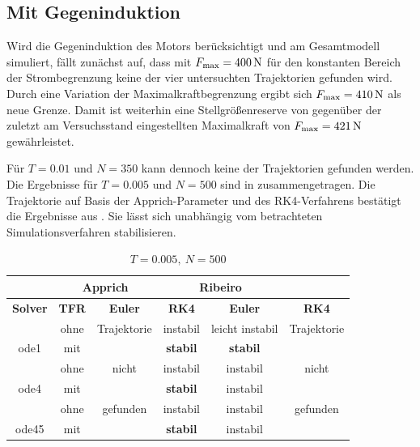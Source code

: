 \subsection{Mit Gegeninduktion}

Wird die Gegeninduktion des Motors berücksichtigt und am Gesamtmodell simuliert, fällt zunächst auf, dass mit $F_{\mathrm{max}}= 400\,\mathrm{N}$ für den konstanten Bereich der Strombegrenzung keine der vier untersuchten Trajektorien gefunden wird. Durch eine Variation der Maximalkraftbegrenzung ergibt sich $F_{\mathrm{max}}= 410\,\mathrm{N}$ als neue Grenze. Damit ist weiterhin eine Stellgrößenreserve von  gegenüber der zuletzt am Versuchsstand eingestellten Maximalkraft von $F_{\mathrm{max}}= 421\,\mathrm{N}$ gewährleistet. 

Für $T=0.01$ und $N=350$ kann dennoch keine der Trajektorien gefunden werden. Die Ergebnisse für $T=0.005$ und $N=500$ sind in  zusammengetragen. Die Trajektorie auf Basis der Apprich-Parameter und des RK4-Verfahrens bestätigt die Ergebnisse aus . Sie lässt sich unabhängig vom betrachteten Simulationsverfahren stabilisieren.
\begin{table}[H]
	\centering
	\caption{$T=0.005, \ N=500$}
		\begin{tabular}{c|c|c|c|c|c}
			\rowcolor[gray]{0.9}
			\multicolumn{2}{c|}{\textbf{Simulation}} & \multicolumn{2}{c|}{\textbf{Apprich}} & \multicolumn{2}{c}{\textbf{Ribeiro}} \\
			\midrule
			\rowcolor[gray]{0.9}
			\textbf{Solver} & \textbf{TFR} & \textbf{Euler} & \textbf{RK4} & \textbf{Euler} & \textbf{RK4} \\
			\midrule
			\cellcolor[gray]{0.9}  											& \cellcolor[gray]{.9}ohne & Trajektorie  & instabil & leicht instabil & Trajektorie\\
			\multirow{-2}{*}{\cellcolor[gray]{.9}ode1}	& \cellcolor[gray]{.9}mit  &   						& \textbf{stabil} & \textbf{stabil} 				 & 	\\
			\midrule		
			\cellcolor[gray]{0.9}  											& \cellcolor[gray]{.9}ohne & nicht	& instabil 						& instabil & nicht\\
			\multirow{-2}{*}{\cellcolor[gray]{.9}ode4}	& \cellcolor[gray]{.9}mit  &        & \textbf{stabil}   	& instabil & \\
			\midrule	
			\cellcolor[gray]{0.9}  											& \cellcolor[gray]{.9}ohne & gefunden 	&  instabil    			& instabil 	& gefunden\\
			\multirow{-2}{*}{\cellcolor[gray]{.9}ode45}	& \cellcolor[gray]{.9}mit  &  					&  \textbf{stabil}  & instabil 	& \\																											
		\end{tabular}
	\label{tab:T001N350Fmax410}
\end{table}

